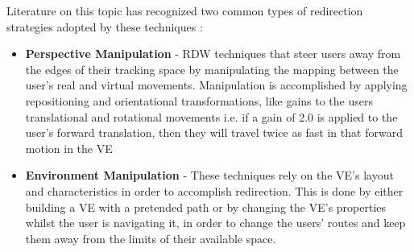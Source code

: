 Literature on this topic has recognized two common types of redirection strategies adopted by these techniques \cite{8255772, Nilsson2018}:
\begin{itemize}
    \item \textbf{Perspective Manipulation} - 
    RDW techniques that steer users away from the edges of their tracking space by manipulating the mapping between the user's real 
    and virtual movements. Manipulation is accomplished by applying repositioning and orientational transformations, like gains to 
    the users translational and rotational movements
    i.e. if a gain of 2.0 is applied to the user's 
    forward translation, then they will travel twice as fast in that forward motion in the \gls{VE}
    
    \item \textbf{Environment Manipulation} - 
    These techniques rely on the \gls{VE}'s layout and characteristics in order to accomplish redirection. This is done by either 
    building a \gls{VE} with a pretended path or by changing the \gls{VE}'s properties whilst the user is navigating it, in order to change 
    the users' routes and keep them away from the limits of their available space.
\end{itemize}

